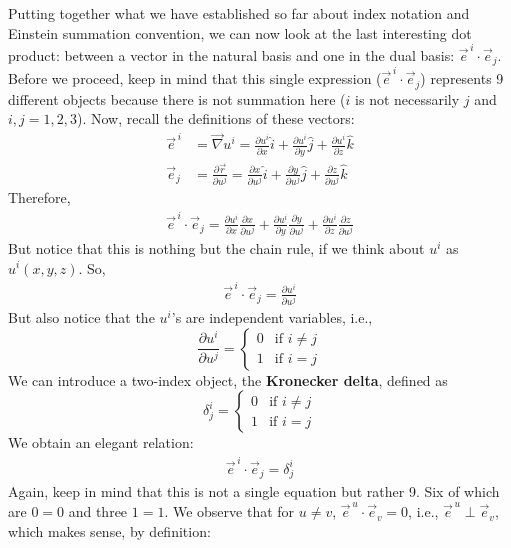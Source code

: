 \documentclass{book}
\theoremstyle{definition}
\begin{document}
Putting together what we have established so far about index notation and Einstein summation convention, we can now look at the last interesting dot product: between a vector in the natural basis and one in the dual basis: $\vec{e}^{\,i}\cdot\vec{e}_j$. Before we proceed, keep in mind that this single expression ($\vec{e}^{\,i}\cdot\vec{e}_j$) represents 9 different objects because there is not summation here ($i$ is not necessarily $j$ and $i,j=1,2,3$). Now, recall the definitions of these vectors:
\begin{align*}
\vec{e}^{\,i} &= \vec{\nabla}u^i = \frac{\partial u^i}{\partial x}\hat{i} + \frac{\partial u^i}{\partial y}\hat{j} + \frac{\partial u^i}{\partial z}\hat{k}\\
\vec{e}_j &= \frac{\partial \vec{r}}{\partial u^j} = \frac{\partial x}{\partial u^j}\hat{i} + \frac{\partial y}{\partial u^j}\hat{j} + \frac{\partial z}{\partial u^j}\hat{k}
\end{align*}
Therefore,
\begin{align*}
\vec{e}^{\,i}\cdot\vec{e}_j = \frac{\partial u^i}{\partial x}\frac{\partial x}{\partial u^j} + \frac{\partial u^i}{\partial y}\frac{\partial y}{\partial u^j} + \frac{\partial u^i}{\partial z}\frac{\partial z}{\partial u^j}
\end{align*}
But notice that this is nothing but the chain rule, if we think about $u^i$ as $u^i(x,y,z)$. So,
\begin{align*}
\boxed{\vec{e}^{\,i}\cdot\vec{e}_j = \frac{\partial u^i}{\partial u^j}}
\end{align*}
But also notice that the $u^i$'s are independent variables, i.e.,
\[ \frac{\partial u^i}{\partial u^j} = 
\begin{cases*}
0 & \text{if $i \neq j$} \\
1 & \text{if $i = j$}
\end{cases*}\]
We can introduce a two-index object, the \textbf{Kronecker delta}, defined as
\[ \boxed{\delta^i_j = 
\begin{cases*}
	0 & \text{if $i \neq j$} \\
	1 & \text{if $i = j$}
\end{cases*}}\]
We obtain an elegant relation:
\begin{align*}
\boxed{\vec{e}^{\,i}\cdot\vec{e}_j = \delta^i_j}
\end{align*}
Again, keep in mind that this is not a single equation but rather 9. Six of which are $0=0$ and three $1=1$. We observe that for $u\neq v$, $\vec{e}^{\,u}\cdot\vec{e}_v = 0$, i.e., $\vec{e}^{\,u} \perp \vec{e}_v$, which makes sense, by definition: 
\end{document}
